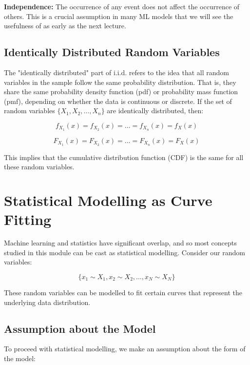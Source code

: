 \textbf{Independence:} The occurrence of any event does not affect the occurrence of others. This is a crucial assumption in many ML models that we will see the usefulness of as early as the next lecture.

\subsection{Identically Distributed Random Variables}

The "identically distributed" part of i.i.d. refers to the idea that all random variables in the sample follow the same probability distribution. That is, they share the same probability density function (pdf) or probability mass function (pmf), depending on whether the data is continuous or discrete. If the set of random variables \(\{X_1, X_2, \ldots, X_n\}\) are identically distributed, then:





\begin{equation}
    f_{X_1}(x) = f_{X_2}(x) = \ldots = f_{X_n}(x) = f_{X}(x)
\end{equation}

\begin{equation}
F_{X_1}(x) = F_{X_2}(x) = \ldots = F_{X_n}(x) = F_{X}(x)
\end{equation}

\noindent This implies that the cumulative distribution function (CDF) is the same for all these random variables.


\section{Statistical Modelling as Curve Fitting}

Machine learning and statistics have significant overlap, and so most concepts studied in this module can be cast as statistical modelling. Consider our random variables:

\[
\{x_1 \sim X_1, x_2 \sim X_2, \ldots, x_N \sim X_N\}
\]

\noindent These random variables can be modelled to fit certain curves that represent the underlying data distribution. 

\subsection{Assumption about the Model}

To proceed with statistical modelling, we make an assumption about the form of the model:


